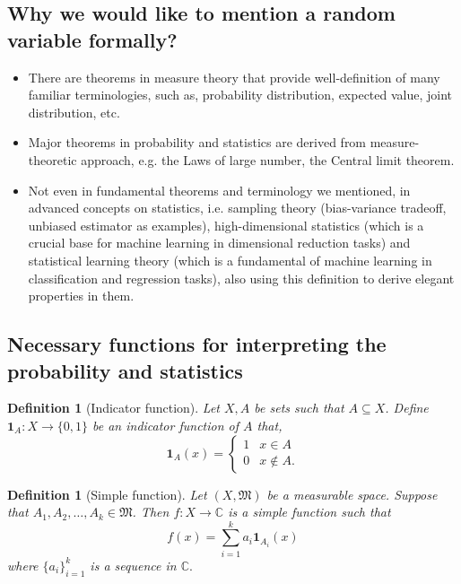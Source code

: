 \documentclass[12pt, a4paper]{report}
\newtheorem{definition}[theorem]{Definition}
\begin{document}
    \subsection{Why we would like to mention a random variable formally?}
    \begin{itemize}
        \item There are theorems in measure theory that provide well-definition of many familiar terminologies, such as, probability distribution, expected value, joint distribution, etc.
        \item Major theorems in probability and statistics are derived from measure-theoretic approach, e.g. the Laws of large number, the Central limit theorem.
        \item Not even in fundamental theorems and terminology we mentioned, in advanced concepts on statistics, i.e. sampling theory (bias-variance tradeoff, unbiased estimator as examples), high-dimensional statistics (which is a crucial base for machine learning in dimensional reduction tasks) and statistical learning theory (which is a fundamental of machine learning in classification and regression tasks), also using this definition to derive elegant properties in them.
    \end{itemize}
    \subsection{Necessary functions for interpreting the probability and statistics}
    \begin{definition}[Indicator function] Let $X,A$ be sets such that $A \subseteq X$. Define $\mathbf{1}_A: X \rightarrow \{0,1\}$ be an indicator function of $A$ that,
        \begin{equation*}
            \mathbf{1}_A(x) = \begin{cases}
                1 & x \in A\\
                0 & x \notin A.
            \end{cases}
        \end{equation*}
    \end{definition}
    \begin{definition}[Simple function] Let $(X,\mathfrak{M})$ be a measurable space. Suppose that $A_1, A_2, \dots, A_k \in \mathfrak{M}$. Then $f: X \to \mathbb{C}$ is a simple function such that
        $$f(x) = \sum_{i=1}^k a_i \mathbf{1}_{A_i}(x)$$
    where $\{a_i\}_{i=1}^k$ is a sequence in $\mathbb{C}.$
    \end{definition}
\end{document}
